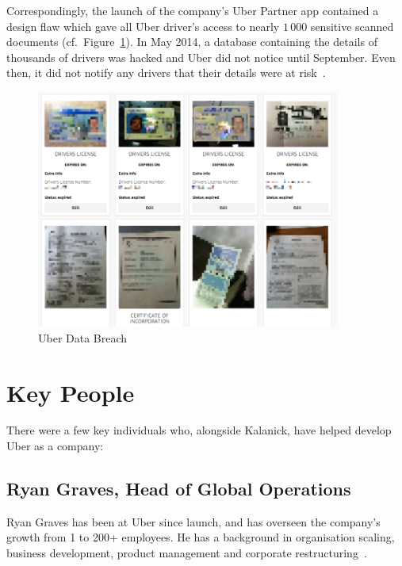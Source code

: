         Correspondingly, the launch of the company's Uber Partner app contained a design flaw which gave all Uber driver's access to nearly $1\,000$ sensitive scanned documents (cf.\ Figure~\ref{fig:uber_data_breach}). In May 2014, a database containing the details of thousands of drivers was hacked and Uber did not notice until September. Even then, it did not notify any drivers that their details were at risk~\parencite{mccallion2015}.

        \begin{figure}
          \centering
          \begin{minipage}{10cm}
            \centering
            \includegraphics[width=10cm]{inc/uber_data_breach.png}
            \caption[Uber Data Breach]{Uber Data Breach~\parencite{biddle2015}}
            \label{fig:uber_data_breach}
          \end{minipage}
        \end{figure}

  \section{Key People}\label{sec:key_people}

    There were a few key individuals who, alongside Kalanick, have helped develop Uber as a company:

    \subsection{Ryan Graves, Head of Global Operations}\label{subsec:ryan_graves}

      Ryan Graves has been at Uber since launch, and has overseen the company's growth from 1 to 200+ employees. He has a background in organisation scaling, business development, product management and corporate restructuring~\parencite{crunchbase2015}.

